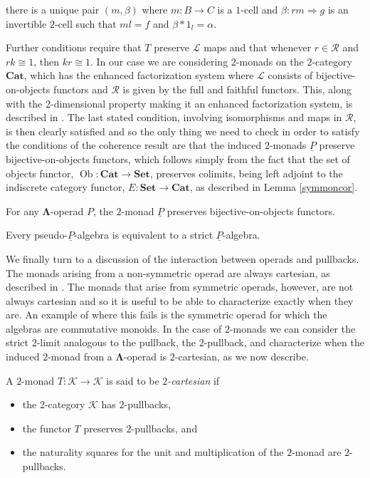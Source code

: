 \documentclass{amsbook} %
\newcommand{\mb}{\mathbf}
\newcommand{\m}[1]{\mathcal{#1}}
\newcommand{\ML}{\mathbf{\Lambda}}
\newcommand{\ob}{\operatorname{Ob}}
\numberwithin{section}{chapter}
\begin{document}
there is a unique pair $(m,\beta)$ where $m \colon B \rightarrow C$ is a $1$-cell and $\beta \colon rm \Rightarrow g$ is an invertible $2$-cell such that $ml = f$ and $\beta \ast 1_{l} = \alpha$.

Further conditions require that $T$ preserve $\mathcal{L}$ maps and that whenever $r \in \mathcal{R}$ and $rk \cong 1$, then $kr \cong 1$. In our case we are considering $2$-monads on the $2$-category $\mathbf{Cat}$, which has the enhanced factorization system where $\m{L}$ consists of bijective-on-objects functors and $\m{R}$ is given by the full and faithful functors. This, along with the $2$-dimensional property making it an enhanced factorization system, is described in \cite{power-gen}. The last stated condition, involving isomorphisms and maps in $\m{R}$, is then clearly satisfied and so the only thing we need to check in order to satisfy the conditions of the coherence result are that the induced $2$-monads $\underline{P}$ preserve bijective-on-objects functors, which follows simply from the fact that the set of objects functor, $\ob \colon \mb{Cat} \rightarrow \mb{Set}$, preserves colimits, being left adjoint to the indiscrete category functor, $E \colon \mb{Set} \rightarrow \mb{Cat}$, as described in Lemma \ref{symmoncor}.

\begin{prop}
For any $\ML$-operad $P$, the $2$-monad $\underline{P}$ preserves bijective-on-objects functors.
\end{prop}
\begin{cor}
Every pseudo-$\underline{P}$-algebra is equivalent to a strict $\underline{P}$-algebra.
\end{cor}



We finally turn to a discussion of the interaction between operads and pullbacks.  The monads arising from a non-symmetric operad are always cartesian, as described in \cite{leinster}. The monads that arise from symmetric operads, however, are not always cartesian and so it is useful to be able to characterize exactly when they are. An example of where this fails is the symmetric operad for which the algebras are commutative monoids. In the case of $2$-monads we can consider the  strict $2$-limit analogous to the pullback, the $2$-pullback, and characterize when the induced $2$-monad from a $\ML$-operad is $2$-cartesian, as we now describe.

\begin{Defi}
A $2$-monad $T \colon \mathcal{K} \rightarrow \mathcal{K}$ is said to be \textit{$2$-cartesian} if
    \begin{itemize}
        \item the $2$-category $\mathcal{K}$ has $2$-pullbacks,
        \item the functor $T$ preserves $2$-pullbacks, and
        \item the naturality squares for the unit and multiplication of the $2$-monad are $2$-pullbacks.
    \end{itemize}
\end{Defi}
\end{document}
